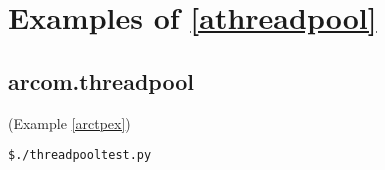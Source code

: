 \section{Examples of \ref{athreadpool}}
\subsection{arcom.threadpool}
(Example \ref{arctpex})
\label{carctpex}
\begin{verbatim}
$./threadpooltest.py
\end{verbatim}

